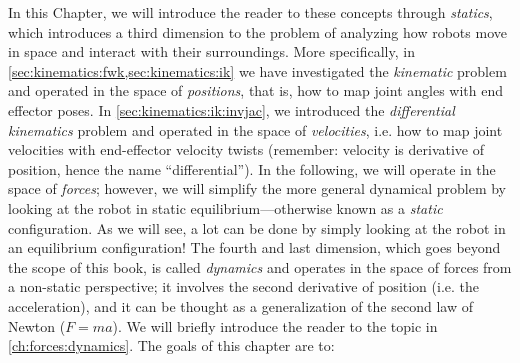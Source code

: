 In this Chapter, we will introduce the reader to these concepts through \emph{statics}, which introduces a third dimension to the problem of analyzing how robots move in space and interact with their surroundings.
More specifically, in \cref{sec:kinematics:fwk,sec:kinematics:ik} we have investigated the \textsl{kinematic} problem and operated in the space of \textsl{positions}, that is, how to map joint angles with end effector poses.
In \cref{sec:kinematics:ik:invjac}, we introduced the \textsl{differential kinematics} problem and operated in the space of \textsl{velocities}, i.e. how to map joint velocities with end-effector velocity twists (remember: velocity is derivative of position, hence the name ``differential'').
In the following, we will operate in the space of \textsl{forces}; however, we will simplify the more general dynamical problem by looking at the robot in static equilibrium---otherwise known as a \textsl{static} configuration.
As we will see, a lot can be done by simply looking at the robot in an equilibrium configuration!
The fourth and last dimension, which goes beyond the scope of this book, is called \textsl{dynamics} and operates in the space of forces from a non-static perspective; it involves the second derivative of position (i.e. the acceleration), and it can be thought as a generalization of the second law of Newton ($F=ma$).
We will briefly introduce the reader to the topic in \cref{ch:forces:dynamics}.
%
The goals of this chapter are to:

